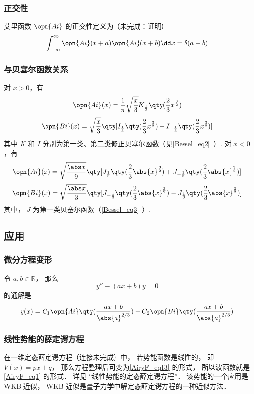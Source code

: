 \subsubsection{正交性}
艾里函数 $\opn{Ai}$ 的正交性定义为（未完成：证明）
\begin{equation}
\int_{-\infty}^\infty\opn{Ai}(x+a)\opn{Ai}(x+b)\dd x=\delta(a-b)
\end{equation}

\subsubsection{与贝塞尔函数关系}
对 $x>0$，有
\begin{equation}
\opn{Ai}(x)=\frac1\pi \sqrt{\frac x3} K_{\frac13} \qty(\frac23 x^{\frac32})
\end{equation}\begin{equation}
\opn{Bi}(x)=\sqrt{\frac x3} \qty[I_{\frac13}\qty(\frac23 x^{\frac32})+I_{-\frac13}\qty(\frac23 x^{\frac32})]
\end{equation}
其中 $K$ 和 $I$ 分别为第一类、第二类修正贝塞尔函数（见\autoref{Bessel_eq2}~）.
对 $x<0$，有
\begin{equation}
\opn{Ai}(x)=\sqrt{\frac{\abs x}{9}}\qty[J_{\frac13}\qty(\frac23 \abs{x}^{\frac32})+J_{-\frac13}\qty(\frac23 \abs{x}^{\frac32})]
\end{equation}
\begin{equation}
\opn{Bi}(x)=\sqrt{\frac{\abs x}{3}} \qty[J_{-\frac13}\qty(\frac23 \abs{x}^{\frac32})-J_{\frac13}\qty(\frac23 \abs{x}^{\frac32})]
\end{equation}
其中， $J$ 为第一类贝塞尔函数（\autoref{Bessel_eq3}~）.

\subsection{应用}
\subsubsection{微分方程变形}
令 $a, b\in \mathbb R$， 那么
\begin{equation}\label{AiryF_eq13}
y'' - (ax + b) y = 0
\end{equation}
的通解是
\begin{equation}\label{AiryF_eq1}
y(x) = C_1\opn{Ai}\qty(\frac{ax+b}{\abs{a}^{2/3}}) + C_2 \opn{Bi}\qty(\frac{ax+b}{\abs{a}^{2/3}})
\end{equation}

\subsubsection{线性势能的薛定谔方程}
在一维定态薛定谔方程（连接未完成）中， 若势能函数是线性的， 即 $V(x) = px + q$， 那么方程整理后可变为\autoref{AiryF_eq13} 的形式， 所以波函数就是\autoref{AiryF_eq1} 的形式． 详见 “线性势能的定态薛定谔方程”． 该势能的一个应用是 WKB 近似， WKB 近似是量子力学中解定态薛定谔方程的一种近似方法．

